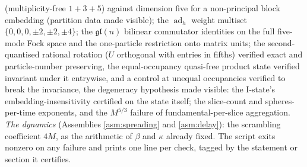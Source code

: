 \documentclass[11pt]{article}
\theoremstyle{definition}
\begin{document}
(multiplicity-free $1 + 3 + 5$) against dimension five for a non-principal block embedding (partition data made visible); the $\operatorname{ad}_h$ weight multiset $\{0,0,0,\pm2,\pm2,\pm4\}$; the $\mathfrak{gl}(n)$ bilinear commutator identities on the full five-mode Fock space and the one-particle restriction onto matrix units; the second-quantised rational rotation ($U$ orthogonal with entries in fifths) verified exact and particle-number preserving, the equal-occupancy quasi-free product state verified invariant under it entrywise, and a control at unequal occupancies verified to break the invariance, the degeneracy hypothesis made visible: the I-state's embedding-insensitivity certified on the state itself; the slice-count and spheres-per-time exponents, and the $M^{5/3}$ failure of fundamental-per-slice aggregation. \emph{The dynamics} (Assemblies \ref{asm:spreading} and \ref{asm:delay}): the scrambling coefficient $4M$, as the arithmetic of $\beta$ and $\kappa$ already fixed. The script exits nonzero on any failure and prints one line per check, tagged by the statement or section it certifies.
\end{document}
